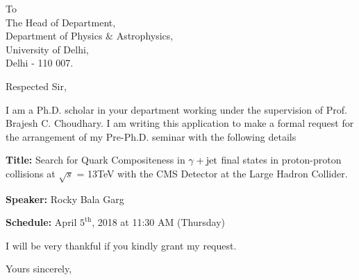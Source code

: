 \documentclass[12pt,a4paper]{letter}
\begin{document}
\begin{letter}{To \\ The Head of Department, \\ Department of Physics $\&$ Astrophysics, \\ University of Delhi, \\ Delhi - 110 007. }
\opening{Respected Sir,}
I am a Ph.D. scholar in your department working under the supervision of Prof.
Brajesh C. Choudhary. I am writing this application to make a formal
request for the arrangement of my Pre-Ph.D. seminar with the following details
\vspace{1cm}


\textbf{Title:} Search for Quark Compositeness in $\gamma+\mathrm{jet}$ final states in proton-proton collisions at $\sqrt{s}$ = 13\unit{TeV} with the CMS Detector at the Large Hadron Collider.

\textbf{Speaker:} Rocky Bala Garg

\textbf{Schedule:} April $5^{\textrm{th}}$, 2018 at 11:30 AM (Thursday)

I will be very thankful if you kindly grant my request.

\closing{Yours sincerely,}
\vspace{2cm}
\end{letter}
\end{document}
